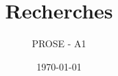 \documentclass[paper=a4,fontsize=11pt]{scrartcl}
\title{Recherches}
\author{PROSE - A1}
\date{\today}
\begin{document}




\renewcommand{\contentsname}{Sommaire}
\tableofcontents %
\newpage
\listoffigures %











\end{document}
